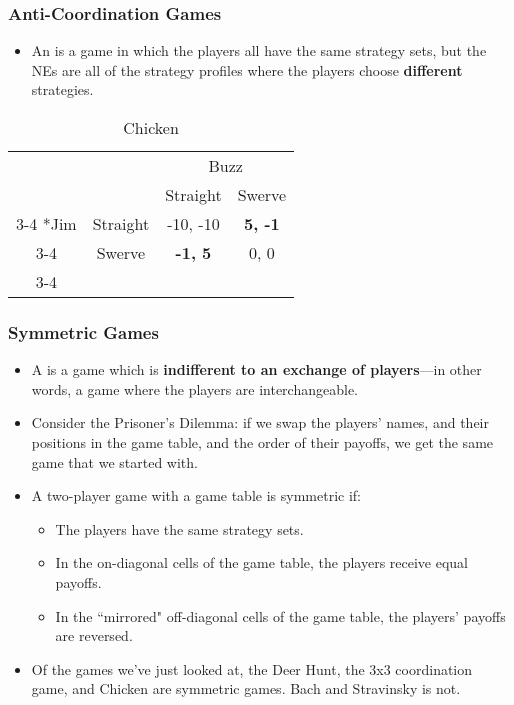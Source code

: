 \begin{frame}
\frametitle{Anti-Coordination Games}
\begin{itemize}
	\item An  is a game in which the players all have the same strategy sets, but the NEs are all of the strategy profiles where the players choose \textbf{different} strategies.
\end{itemize}
\begin{table}[h]
	\caption*{Chicken}
	\centering
	\begin{tabular}{cc|c|c|}
		& \multicolumn{1}{c}{} & \multicolumn{2}{c}{Buzz}\\
		& \multicolumn{1}{c}{} & \multicolumn{1}{c}{Straight}  & \multicolumn{1}{c}{Swerve} \\\cline{3-4}
		\multirow{2}*{Jim}  & Straight & -10, -10 & \colorbox{blue!25}{\textbf{5, -1}} \\\cline{3-4}
		& Swerve & \colorbox{blue!25}{\textbf{-1, 5}} & 0, 0 \\\cline{3-4}
	\end{tabular}
\end{table}
\end{frame}

\begin{frame}
\frametitle{Symmetric Games}
\begin{itemize}
	\item A  is a game which is \textbf{indifferent to an exchange of players}---in other words, a game where the players are interchangeable.
	\item Consider the Prisoner's Dilemma: if we swap the players' names, and their positions in the game table, and the order of their payoffs, we get the same game that we started with.
	\item A two-player game with a game table is symmetric if:
	\begin{itemize}
		\item The players have the same strategy sets.
		\item In the on-diagonal cells of the game table, the players receive equal payoffs.
		\item In the ``mirrored" off-diagonal cells of the game table, the players' payoffs are reversed.
	\end{itemize}
	\item Of the games we've just looked at, the Deer Hunt, the 3x3 coordination game, and Chicken are symmetric games. Bach and Stravinsky is not.
\end{itemize}
\end{frame}

